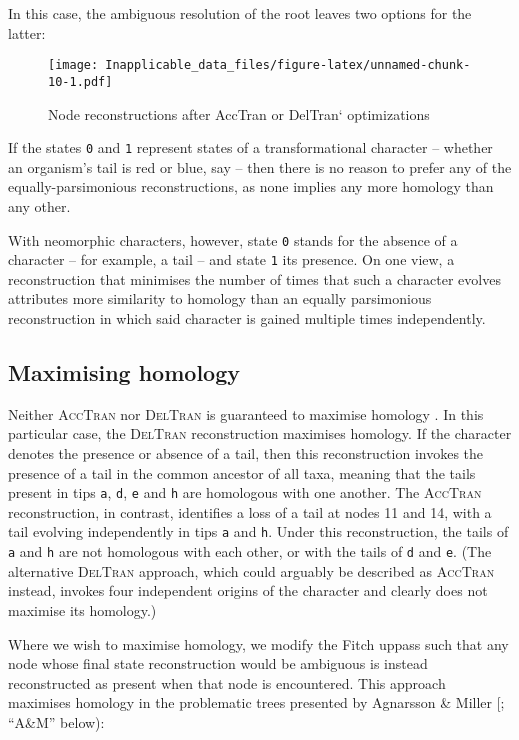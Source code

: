 \documentclass[]{book}
\theoremstyle{definition}
\theoremstyle{definition}
\theoremstyle{definition}
\theoremstyle{remark}
\begin{document}
In this case, the ambiguous resolution of the root leaves two options
for the latter:

\begin{figure}
\centering
\texttt{[image: Inapplicable\_data\_files/figure-latex/unnamed-chunk-10-1.pdf]}
\caption{\label{fig:unnamed-chunk-10}Node reconstructions after AccTran or
DelTran` optimizations}
\end{figure}

If the states \texttt{0} and \texttt{1} represent states of a
transformational character -- whether an organism's tail is red or blue,
say -- then there is no reason to prefer any of the equally-parsimonious
reconstructions, as none implies any more homology than any other.

With neomorphic characters, however, state \texttt{0} stands for the
absence of a character -- for example, a tail -- and state \texttt{1}
its presence. On one view, a reconstruction that minimises the number of
times that such a character evolves attributes more similarity to
homology than an equally parsimonious reconstruction in which said
character is gained multiple times independently.

\hypertarget{maximising-homology}{%
\subsection{Maximising homology}\label{maximising-homology}}

Neither \textsc{AccTran} nor \textsc{DelTran} is guaranteed to maximise
homology \citep{Agnarsson2008}. In this particular case, the
\textsc{DelTran} reconstruction maximises homology. If the character
denotes the presence or absence of a tail, then this reconstruction
invokes the presence of a tail in the common ancestor of all taxa,
meaning that the tails present in tips \texttt{a}, \texttt{d},
\texttt{e} and \texttt{h} are homologous with one another. The
\textsc{AccTran} reconstruction, in contrast, identifies a loss of a
tail at nodes 11 and 14, with a tail evolving independently in tips
\texttt{a} and \texttt{h}. Under this reconstruction, the tails of
\texttt{a} and \texttt{h} are not homologous with each other, or with
the tails of \texttt{d} and \texttt{e}. (The alternative
\textsc{DelTran} approach, which could arguably be described as
\textsc{AccTran} instead, invokes four independent origins of the
character and clearly does not maximise its homology.)

Where we wish to maximise homology, we modify the Fitch uppass such that
any node whose final state reconstruction would be ambiguous is instead
reconstructed as present when that node is encountered. This approach
maximises homology in the problematic trees presented by Agnarsson \&
Miller {[}\citeyearpar{Agnarsson2008}; ``A\&M'' below):
\end{document}
